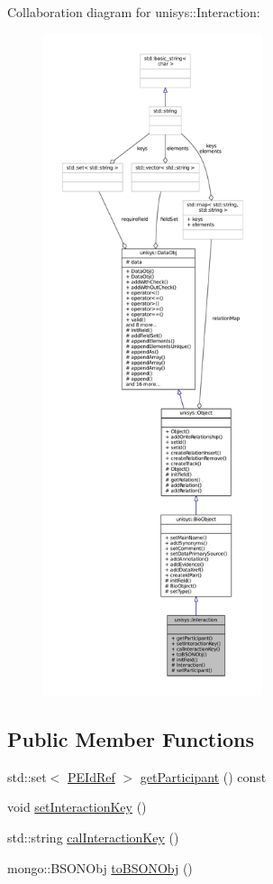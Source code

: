 Collaboration diagram for unisys\-:\-:Interaction\-:
\nopagebreak
\begin{figure}[H]
\begin{center}
\leavevmode
\includegraphics[height=550pt]{classunisys_1_1Interaction__coll__graph}
\end{center}
\end{figure}
\subsection*{Public Member Functions}
\begin{DoxyCompactItemize}
\item 
std\-::set$<$ \hyperlink{classunisys_1_1PEIdRef}{P\-E\-Id\-Ref} $>$ \hyperlink{classunisys_1_1Interaction_ac42ad66bc0a65a4299c8beea126de272}{get\-Participant} () const 
\item 
void \hyperlink{classunisys_1_1Interaction_a73354f785c9c853654a58b2c1a2339ea}{set\-Interaction\-Key} ()
\item 
std\-::string \hyperlink{classunisys_1_1Interaction_a3a2f88086f108cb21c3076b18c861541}{cal\-Interaction\-Key} ()
\item 
mongo\-::\-B\-S\-O\-N\-Obj \hyperlink{classunisys_1_1Interaction_a1105bf288d37acc3079146d1c5d4335c}{to\-B\-S\-O\-N\-Obj} ()
\end{DoxyCompactItemize}
